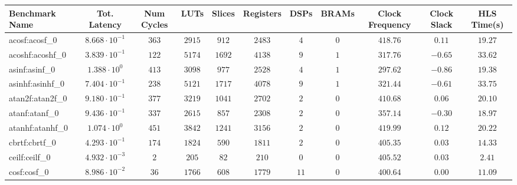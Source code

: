 \begin{tabular}{|l|c|c|c|c|c|c|c|c|c|c|}
\hline
Benchmark Name               & Tot. Latency            & Num Cycles & LUTs      & Slices    & Registers & DSPs    & BRAMs & Clock Frequency & Clock Slack & HLS Time(s) \\
\hline
acosf:acosf\_0               & $ 8.668 \cdot 10^{-1} $ & $ 363    $ & $ 2915  $ & $ 912   $ & $ 2483  $ & $ 4   $ & $ 0 $ & $ 418.76      $ & $ 0.11    $ & $ 19.27   $ \\
acoshf:acoshf\_0             & $ 3.839 \cdot 10^{-1} $ & $ 122    $ & $ 5174  $ & $ 1692  $ & $ 4138  $ & $ 9   $ & $ 1 $ & $ 317.76      $ & $ -0.65   $ & $ 33.62   $ \\
asinf:asinf\_0               & $ 1.388 \cdot 10^{0}  $ & $ 413    $ & $ 3098  $ & $ 977   $ & $ 2528  $ & $ 4   $ & $ 1 $ & $ 297.62      $ & $ -0.86   $ & $ 19.38   $ \\
asinhf:asinhf\_0             & $ 7.404 \cdot 10^{-1} $ & $ 238    $ & $ 5121  $ & $ 1717  $ & $ 4078  $ & $ 9   $ & $ 1 $ & $ 321.44      $ & $ -0.61   $ & $ 33.75   $ \\
atan2f:atan2f\_0             & $ 9.180 \cdot 10^{-1} $ & $ 377    $ & $ 3219  $ & $ 1041  $ & $ 2702  $ & $ 2   $ & $ 0 $ & $ 410.68      $ & $ 0.06    $ & $ 20.10   $ \\
atanf:atanf\_0               & $ 9.436 \cdot 10^{-1} $ & $ 337    $ & $ 2615  $ & $ 857   $ & $ 2308  $ & $ 2   $ & $ 0 $ & $ 357.14      $ & $ -0.30   $ & $ 18.97   $ \\
atanhf:atanhf\_0             & $ 1.074 \cdot 10^{0}  $ & $ 451    $ & $ 3842  $ & $ 1241  $ & $ 3156  $ & $ 2   $ & $ 0 $ & $ 419.99      $ & $ 0.12    $ & $ 20.22   $ \\
cbrtf:cbrtf\_0               & $ 4.293 \cdot 10^{-1} $ & $ 174    $ & $ 1824  $ & $ 590   $ & $ 1811  $ & $ 2   $ & $ 0 $ & $ 405.35      $ & $ 0.03    $ & $ 14.33   $ \\
ceilf:ceilf\_0               & $ 4.932 \cdot 10^{-3} $ & $ 2      $ & $ 205   $ & $ 82    $ & $ 210   $ & $ 0   $ & $ 0 $ & $ 405.52      $ & $ 0.03    $ & $ 2.41    $ \\
cosf:cosf\_0                 & $ 8.986 \cdot 10^{-2} $ & $ 36     $ & $ 1766  $ & $ 608   $ & $ 1779  $ & $ 11  $ & $ 0 $ & $ 400.64      $ & $ 0.00    $ & $ 11.09   $ \\

\end{tabular}
